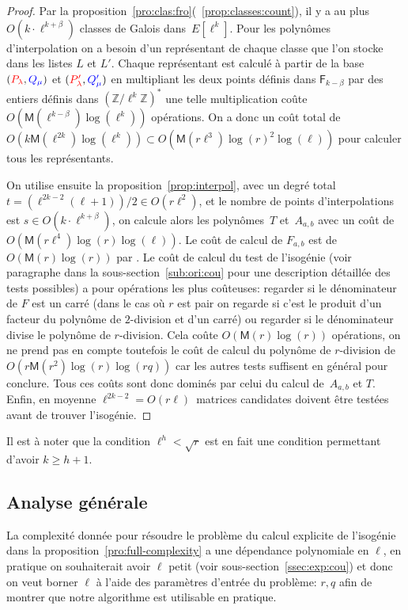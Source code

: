\documentclass[10pt,a4paper]{book}
\theoremstyle{plain}
\theoremstyle{definition}
\theoremstyle{definition}
\theoremstyle{definition}
\theoremstyle{definition}
\theoremstyle{remark}
\theoremstyle{remark}
\theoremstyle{definition}
\begin{document}
\begin{proof}
  Par la proposition~\ref{pro:clas:fro}(~\ref{prop:classes:count}), il y a au 
  plus~$O(k \cdot \ell^{k+\beta})$ classes de Galois dans~$E[\ell^k]$. 
  Pour les polynômes d'interpolation on a besoin d'un représentant de chaque 
  classe que l'on stocke dans les listes $L$ et $L'$. Chaque représentant est
  calculé à partir de la base $(\color{red}P_{\lambda}\color{black},
  \color{blue}Q_{\mu}\color{black})$ et $(\color{red}P'_{\lambda}\color{black},
  \color{blue}Q'_{\mu}\color{black})$ en multipliant les deux points définis 
  dans $\mathsf{F}_{k-\beta}$ par des entiers définis dans 
  $\left( \mathbb{Z}/\ell^{k}\mathbb{Z}\right)^*$ une telle multiplication coûte 
  $O(\mathsf{M}(\ell^{k-\beta})\log(\ell^k))$ opérations. On a donc un coût total de 
  $O(k\mathsf{M}(\ell^{2k})\log(\ell^k)) \subset O(\mathsf{M}(r\ell^{3})\log(r)^2 \log(\ell))$
  pour calculer tous les représentants.
  
  
  On utilise ensuite la proposition~\ref{prop:interpol}, avec un degré total
  ~$t = (\ell^{2k-2}(\ell+1))/2\in O(r\ell^2)$, et le nombre de points d'interpolations
  est $s \in O(k \cdot \ell^{k+\beta})$, on calcule alors les polynômes~$T$
  et~$A_{a,b}$ avec un coût de~$O(\mathsf{M}(r \ell^4)\log(r)\log(\ell))$.  Le coût
  de calcul de $F_{a,b}$ est de $O(\mathsf{M}(r)\log(r))$ par 
  \cite[Théorème 7.5]{algeff17}. Le coût de calcul du test de l'isogénie (voir
  paragraphe dans la sous-section~\ref{sub:ori:cou} pour une description 
  détaillée des tests possibles) a pour opérations 
  les plus coûteuses: regarder si le dénominateur de $F$ est un carré (dans
  le cas où $r$ est pair on regarde si c’est le produit d’un facteur du polynôme de 
  $2$-division et d’un carré) ou regarder si le dénominateur
  divise le polynôme de $r$-division. Cela coûte $O(\mathsf{M}(r)
  \log(r))$ opérations, on ne prend pas en compte toutefois le coût de calcul
   du polynôme de $r$-division  de $O(r\mathsf{M}(r^2)\log(r)\log(r q))$ car 
  les autres tests suffisent en général pour conclure. Tous ces coûts sont donc
  dominés par celui du calcul de~$A_{a,b}$ et $T$.  Enfin, en moyenne 
   ${\ell^{2k-2}=O(r\ell)}$~matrices candidates doivent être testées
   avant de trouver l'isogénie.
\end{proof}
 
  Il est à noter que la condition $\ell^h<\sqrt{r}$ est en fait une condition 
  permettant d'avoir $k \geqslant h+1$.

\subsection{Analyse générale}
La complexité donnée pour résoudre le problème du calcul explicite de 
l'isogénie dans la proposition~\ref{pro:full-complexity} a une dépendance 
polynomiale en $\ell$, en pratique on souhaiterait avoir $\ell$ petit 
(voir sous-section~\ref{ssec:exp:cou})
et donc on veut borner $\ell$ à l'aide des paramètres d'entrée du problème: $r,q$
afin de montrer que notre algorithme est utilisable en pratique. 
\end{document}
